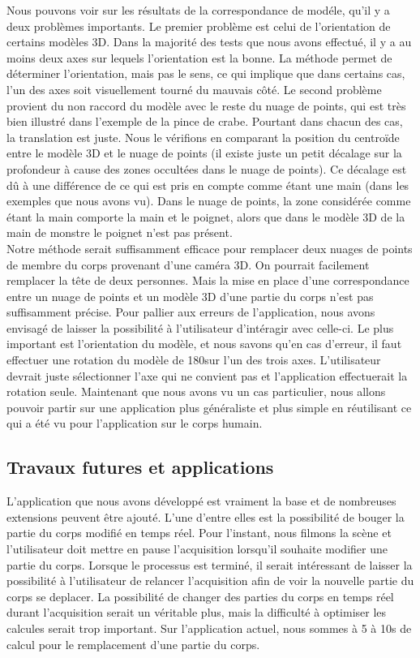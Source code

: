 Nous pouvons voir sur les résultats de la correspondance de modéle, qu'il y a deux problèmes importants. Le premier problème est celui de l'orientation
de certains modèles 3D. Dans la majorité des tests que nous avons effectué, il y a au moins deux axes sur lequels l'orientation est la bonne. La méthode 
permet de déterminer l'orientation, mais pas le sens, ce qui implique que dans certains cas, l'un des axes soit visuellement tourné du mauvais côté.
Le second problème provient du non raccord du modèle avec le reste du nuage de points, qui est très bien illustré dans l'exemple de la pince de crabe.
Pourtant dans chacun des cas, la translation est juste. Nous le vérifions en comparant la position du centroïde entre le modèle 3D et le nuage de points
(il existe juste un petit décalage sur la profondeur à cause des zones occultées dans le nuage de points). Ce décalage est dû à une différence de ce qui est 
pris en compte comme étant une main (dans les exemples que nous avons vu). Dans le nuage de points, la zone considérée comme étant la main comporte la main et le poignet, alors que 
dans le modèle 3D de la main de monstre le poignet n'est pas présent.\\

Notre méthode serait suffisamment efficace pour remplacer deux nuages de points de membre du corps provenant d'une caméra 3D. On pourrait facilement
remplacer la tête de deux personnes.
Mais la mise en place d'une correspondance entre un nuage de points et un modèle 3D d'une partie du corps n'est pas suffisamment précise. Pour pallier
aux erreurs de l'application, nous avons envisagé de laisser la possibilité à l'utilisateur d'intéragir avec celle-ci. Le plus important est l'orientation
du modèle, et nous savons qu'en cas d'erreur, il faut effectuer une rotation du modèle de 180\degre sur l'un des trois axes. L'utilisateur devrait juste
sélectionner l'axe qui ne convient pas et l'application effectuerait la rotation seule. Maintenant que nous avons vu un cas particulier, nous allons pouvoir
partir sur une application plus généraliste et plus simple en réutilisant ce qui a été vu pour l'application sur le corps humain.  

\subsection{Travaux futures et applications}
L'application que nous avons développé est vraiment la base et de nombreuses extensions peuvent être ajouté.
L'une d'entre elles est la possibilité de bouger la partie du corps modifié en temps réel. Pour l'instant, nous filmons
la scène et l'utilisateur doit mettre en pause l'acquisition lorsqu'il souhaite modifier une partie du corps. Lorsque le
processus est terminé, il serait intéressant de laisser la possibilité à l'utilisateur de relancer l'acquisition afin de
voir la nouvelle partie du corps se deplacer. La possibilité de changer des parties du corps en temps réel durant 
l'acquisition serait un véritable plus, mais la difficulté à optimiser les calcules serait trop important. Sur l'application
actuel, nous sommes à 5 à 10s de calcul pour le remplacement d'une partie du corps.\\

